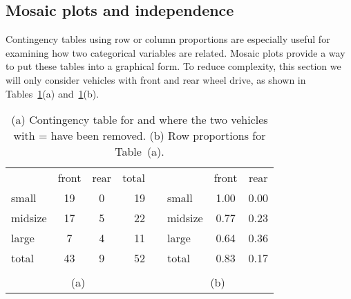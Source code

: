 \subsection{Mosaic plots and independence}
\label{mosaicPlotsAndIndependence}

Contingency tables using row or column proportions are especially useful for examining how two categorical variables are related. Mosaic plots provide a way to put these tables into a graphical form. To reduce complexity, this section we will only consider vehicles with front and rear wheel drive, as shown in Tables~\ref{typeDriveTrainTableTotalsMinus4wd}(a) and~\ref{typeDriveTrainTableTotalsMinus4wd}(b).
\begin{table}
\begin{center}
\begin{tabular}{l cc r  c l cc}
   \cline{1-4}\cline{6-8}
 & front & rear & total & \hspace{1cm} & & front & rear \\ 
   \cline{1-4}\cline{6-8}
small &  19 &   0 & 19  & & small &  1.00 &   0.00\\ 
midsize &  17 &  5 & 22 & & midsize &  0.77 & 0.23 \\ 
large &   7 &   4 & 11  & & large &   0.64 &  0.36\\ 
   \cline{1-4} \cline{6-8}
total & 43 & 9 & 52  & & total & 0.83 & 0.17\\
   \cline{1-4} \cline{6-8}
 &&&&&&&  \\
   \multicolumn{4}{c}{(a)} && \multicolumn{3}{c}{(b)}
\end{tabular}
\end{center}
\vspace{-6.5mm}
\caption{(a) Contingency table for  and  where the two vehicles with  =  have been removed. (b) Row proportions for Table~(a).}
\label{typeDriveTrainTableTotalsMinus4wd}
\end{table}


